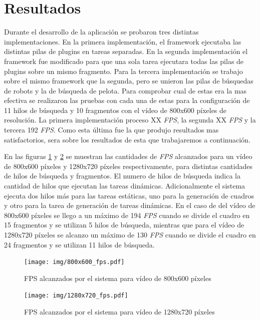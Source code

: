 \section{Resultados}

Durante el desarrollo de la aplicación se probaron tres distintas
implementaciones. En la primera implementación, el framework ejecutaba las
distintas pilas de plugins en tareas separadas. En la segunda implementación el
framework fue modificado para que una sola tarea ejecutara todas las pilas de
plugins sobre un mismo fragmento. Para la tercera implementación se trabajo
sobre el mismo framework que la segunda, pero se unieron las pilas de búsquedas
de robots y la de búsqueda de pelota. Para comprobar cual de estas era la mas
efectiva se realizaron las pruebas con cada una de estas para la configuración
de 11 hilos de búsqueda y 10 fragmentos con el vídeo de 800x600 píxeles de
resolución. La primera implementación proceso XX \emph{FPS}, la segunda XX
\emph{FPS} y la tercera 192 \emph{FPS}. Como esta última fue la que produjo
resultados mas satisfactorios, sera sobre los resultados de esta que
trabajaremos a continuación.

En las figuras \ref{800fps} y \ref{1280fps} se muestran las cantidades de
\emph{FPS} alcanzados para un vídeo de 800x600 píxeles y 1280x720 píxeles
respectivamente, para distintas cantidades de hilos de búsqueda y fragmentos.
El numero de hilos de búsqueda indica la cantidad de hilos que ejecutan las
tareas dinámicas. Adicionalmente el sistema ejecuta dos hilos más para las
tareas estáticas, uno para la generación de cuadros y otro para la tarea de
generación de tareas dinámicas. En el caso de del vídeo de 800x600 píxeles se
llego a un máximo de 194 \emph{FPS} cuando se divide el cuadro en 15 fragmentos
y se utilizan 5 hilos de búsqueda, mientras que para el vídeo de 1280x720
píxeles se alcanzo un máximo de 130 \emph{FPS} cuando se divide el cuadro en 24
fragmentos y se utilizan 11 hilos de búsqueda.

\begin{figure}[!h]

	\texttt{[image: img/800x600\_fps.pdf]}
	\caption{FPS alcanzados por el sistema para vídeo de 800x600 píxeles}
	\label{800fps}

\end{figure}

\begin{figure}[!h]

	\texttt{[image: img/1280x720\_fps.pdf]}
	\caption{FPS alcanzados por el sistema para vídeo de 1280x720 píxeles}
	\label{1280fps}

\end{figure}

